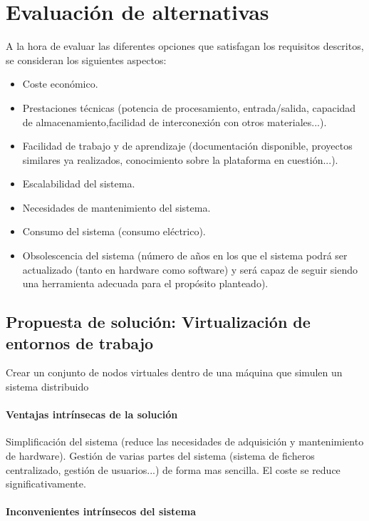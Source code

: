 \section{Evaluación de alternativas}

A la hora de evaluar las diferentes opciones que satisfagan los requisitos descritos, se consideran los siguientes aspectos:

\begin{itemize}
  \item Coste económico.
  \item Prestaciones técnicas (potencia de procesamiento, entrada/salida, capacidad de almacenamiento,facilidad de interconexión con otros materiales...).
  \item Facilidad de trabajo y de aprendizaje (documentación disponible, proyectos similares ya realizados, conocimiento sobre la plataforma en cuestión...).
  \item Escalabilidad del sistema.
  \item Necesidades de mantenimiento del sistema.
  \item Consumo del sistema (consumo eléctrico).
  \item Obsolescencia del sistema (número de años en los que el sistema podrá ser actualizado (tanto en hardware como software) y será capaz de seguir siendo una herramienta adecuada para el propósito planteado).

\end{itemize}

\subsection{Propuesta de solución: Virtualización de entornos de trabajo}

Crear un conjunto de nodos virtuales dentro de una máquina que simulen un sistema distribuido

\paragraph{Ventajas intrínsecas de la solución}

Simplificación del sistema (reduce las necesidades de adquisición y mantenimiento de hardware).
Gestión de varias partes del sistema (sistema de ficheros centralizado, gestión de usuarios...) de forma mas sencilla. El coste se reduce significativamente.

\paragraph{Inconvenientes intrínsecos del sistema}

